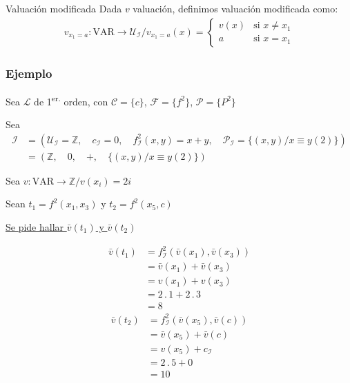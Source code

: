 \medskip

\begin{definicion}{Valuación modificada}{}
    Dada $v$ valuación, definimos valuación modificada como:
    \begin{gather*}
        v_{x_{1} = a}: \mathrm{VAR} \to \mathcal{U}_{\mathcal{I}} / 
        v_{x_{1}=a}(x) =
        \begin{cases}
            v(x) & \text{si } x \neq x_1 \\
            a & \text{si } x = x_1
        \end{cases}
    \end{gather*}
\end{definicion}

\subsubsection{Ejemplo}

Sea $\mathcal{L}$ de 1\textsuperscript{er.} orden, con $\mathcal{C}=\{c\}$,
$\mathcal{F}=\{ f^{2} \}$, $\mathcal{P}=\{ P^{2} \}$

Sea 
\begin{align*}
    \mathcal{I} &= (\mathcal{U}_{\mathcal{I}} = \mathbb{Z}, \quad
            c_{\mathcal{I}} = 0, \quad
            f_{\mathcal{I}}^2 (x,y) = x+y, \quad
            \mathcal{P}_{\mathcal{I}} = \{ (x,y)/ x \equiv y (2) \}
    ) \\
    &= ( \mathbb{Z}, \quad
    0, \quad
    +, \quad
    \{ (x,y) / x \equiv y (2) \} )
\end{align*}

Sea $v: \mathrm{VAR} \to \mathbb{Z} / v(x_i) = 2i$

Sean $t_1 = f^{2} (x_1, x_3)$ y $t_2 = f^{2} (x_5, c)$

\underline{Se pide hallar $\bar{v}(t_1)$ y $\bar{v} (t_2)$}

\begin{align*}
    \bar{v}(t_1) &= f_{\mathcal{I}}^{2}(\bar{v}(x_1), \bar{v}(x_3)) \\
                 &= \bar{v}(x_1) + \bar{v}(x_3) \\
                 &= v(x_1) + v(x_3) \\
                 &= 2\, . \, 1 + 2 \, . \, 3 \\
                 &= 8 
\end{align*}
\begin{align*}
    \bar{v}(t_2) &= f_{\mathcal{I}}^{2}(\bar{v}(x_5), \bar{v}(c)) \\
                 &= \bar{v}(x_5) + \bar{v}(c) \\
                 &= v(x_5) + c_{\mathcal{I}} \\ 
                 &= 2\, . \, 5 + 0 \\
                 &= 10
\end{align*}


